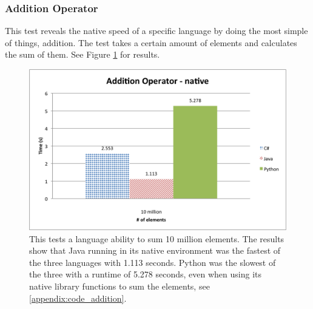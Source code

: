 \subsubsection{Addition Operator}

This test reveals the native speed of a specific language by doing the most simple of things, addition. The test takes a certain amount of elements and calculates the sum of them. See Figure \ref{fig:native_addition} for results.

\begin{figure}[h]
	\centering
	\includegraphics[width=1.0\linewidth]{chapters/new_media/AdditionOperatorNative.png}
	\caption{This tests a language ability to sum 10 million elements. The results show that Java running in its native environment was the fastest of the three languages with 1.113 seconds. Python was the slowest of the three with a runtime of 5.278 seconds, even when using its native library functions to sum the elements, see \ref{appendix:code_addition}.}
	\label{fig:native_addition}
\end{figure}

